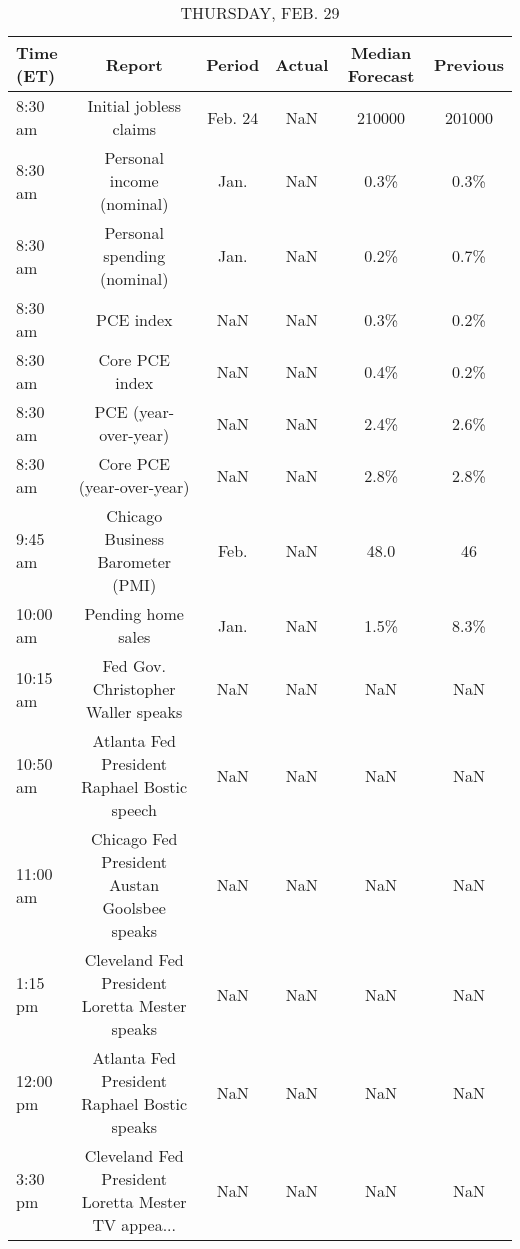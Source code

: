 \documentclass{article}%
\begin{document}
\begin{table}[htbp]%
\caption{THURSDAY, FEB. 29}%
\centering%
\begin{adjustbox}{width=1\textwidth}%
\begin{tabular}{lccccc}
\toprule
Time (ET) &                                             Report &  Period & Actual & Median Forecast & Previous \\
\midrule
  8:30 am &                             Initial jobless claims & Feb. 24 &    NaN &          210000 &   201000 \\
  8:30 am &                          Personal income (nominal) &    Jan. &    NaN &            0.3\% &     0.3\% \\
  8:30 am &                        Personal spending (nominal) &    Jan. &    NaN &            0.2\% &     0.7\% \\
  8:30 am &                                          PCE index &     NaN &    NaN &            0.3\% &     0.2\% \\
  8:30 am &                                     Core PCE index &     NaN &    NaN &            0.4\% &     0.2\% \\
  8:30 am &                               PCE (year-over-year) &     NaN &    NaN &            2.4\% &     2.6\% \\
  8:30 am &                          Core PCE (year-over-year) &     NaN &    NaN &            2.8\% &     2.8\% \\
  9:45 am &                   Chicago Business Barometer (PMI) &    Feb. &    NaN &            48.0 &       46 \\
 10:00 am &                                 Pending home sales &    Jan. &    NaN &            1.5\% &     8.3\% \\
 10:15 am &                 Fed Gov. Christopher Waller speaks &     NaN &    NaN &             NaN &      NaN \\
 10:50 am &        Atlanta Fed President Raphael Bostic speech &     NaN &    NaN &             NaN &      NaN \\
 11:00 am &       Chicago Fed President Austan Goolsbee speaks &     NaN &    NaN &             NaN &      NaN \\
  1:15 pm &      Cleveland Fed President Loretta Mester speaks &     NaN &    NaN &             NaN &      NaN \\
 12:00 pm &        Atlanta Fed President Raphael Bostic speaks &     NaN &    NaN &             NaN &      NaN \\
  3:30 pm & Cleveland Fed President Loretta Mester TV appea... &     NaN &    NaN &             NaN &      NaN \\
\bottomrule
\end{tabular}
%
\end{adjustbox}%
\end{table}
\end{document}
